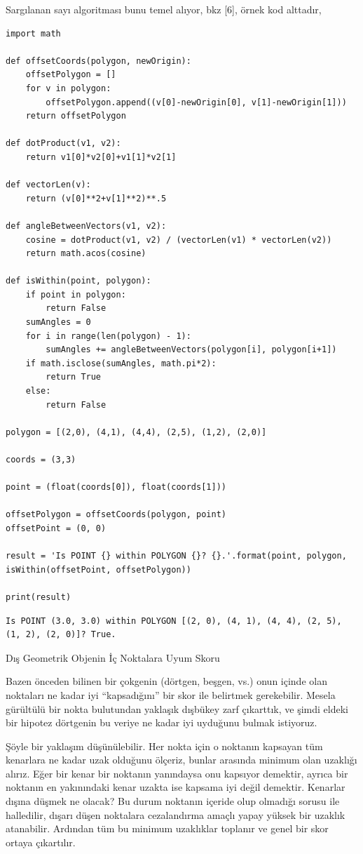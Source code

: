 \documentclass[12pt,fleqn]{article}\usepackage{../../common}
\begin{document}
Sargılanan sayı algoritması bunu temel alıyor, bkz [6], örnek kod alttadır,

\begin{verbatim}
import math

def offsetCoords(polygon, newOrigin):
    offsetPolygon = []
    for v in polygon:
        offsetPolygon.append((v[0]-newOrigin[0], v[1]-newOrigin[1]))
    return offsetPolygon

def dotProduct(v1, v2):
    return v1[0]*v2[0]+v1[1]*v2[1]

def vectorLen(v):
    return (v[0]**2+v[1]**2)**.5

def angleBetweenVectors(v1, v2):
    cosine = dotProduct(v1, v2) / (vectorLen(v1) * vectorLen(v2))
    return math.acos(cosine)

def isWithin(point, polygon):
    if point in polygon:
        return False
    sumAngles = 0
    for i in range(len(polygon) - 1):
        sumAngles += angleBetweenVectors(polygon[i], polygon[i+1])
    if math.isclose(sumAngles, math.pi*2):
        return True
    else:
        return False

polygon = [(2,0), (4,1), (4,4), (2,5), (1,2), (2,0)]

coords = (3,3)

point = (float(coords[0]), float(coords[1]))

offsetPolygon = offsetCoords(polygon, point)
offsetPoint = (0, 0)

result = 'Is POINT {} within POLYGON {}? {}.'.format(point, polygon, isWithin(offsetPoint, offsetPolygon))

print(result) 
\end{verbatim}

\begin{verbatim}
Is POINT (3.0, 3.0) within POLYGON [(2, 0), (4, 1), (4, 4), (2, 5), (1, 2), (2, 0)]? True.
\end{verbatim}

Dış Geometrik Objenin İç Noktalara Uyum Skoru

Bazen önceden bilinen bir çokgenin (dörtgen, beşgen, vs.) onun içinde olan
noktaları ne kadar iyi ``kapsadığını'' bir skor ile belirtmek
gerekebilir. Mesela gürültülü bir nokta bulutundan yaklaşık dışbükey zarf
çıkarttık, ve şimdi eldeki bir hipotez dörtgenin bu veriye ne kadar iyi
uyduğunu bulmak istiyoruz. 

Şöyle bir yaklaşım düşünülebilir. Her nokta için o noktanın kapsayan tüm
kenarlara ne kadar uzak olduğunu ölçeriz, bunlar arasında minimum olan
uzaklığı alırız. Eğer bir kenar bir noktanın yanındaysa onu kapsıyor
demektir, ayrıca bir noktanın en yakınındaki kenar uzakta ise kapsama iyi
değil demektir. Kenarlar dışına düşmek ne olacak? Bu durum noktanın içeride
olup olmadığı sorusu ile halledilir, dışarı düşen noktalara cezalandırma
amaçlı yapay yüksek bir uzaklık atanabilir. Ardından tüm bu minimum
uzaklıklar toplanır ve genel bir skor ortaya çıkartılır.
\end{document}
